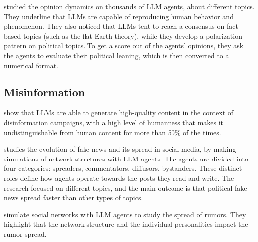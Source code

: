 \citet{piao2025emergencehumanlikepolarizationlarge} studied the opinion dynamics on thousands of LLM agents, about different topics. They underline that LLMs are capable of reproducing human behavior and phenomenon. They also noticed that LLMs tent to reach a consensus on fact-based topics (such as the flat Earth theory), while they develop a polarization pattern on political topics.
To get a score out of the agents' opinions, they ask the agents to evaluate their political leaning, which is then converted to a numerical format.





\subsection{Misinformation}

\citet{williams2025hqdisinformation} show that LLMs are able to generate high-quality content in the context of disinformation campaigns, with a high level of humanness that makes it undistinguishable from human content for more than 50\% of the times.

\citet{liu2024tinyslipgiantleap} studies the evolution of fake news and its spread in social media, by making simulations of network structures with LLM agents.
The agents are divided into four categories: spreaders, commentators, diffusors, bystanders. These distinct roles define how agents operate towards the posts they read and write.
The research focused on different topics, and the main outcome is that political fake news spread faster than other types of topics.

\citet{hu2025simulatingrumorspreadingsocial} simulate social networks with LLM agents to study the spread of rumors. They highlight that the network structure and the individual personalities impact the rumor spread.



